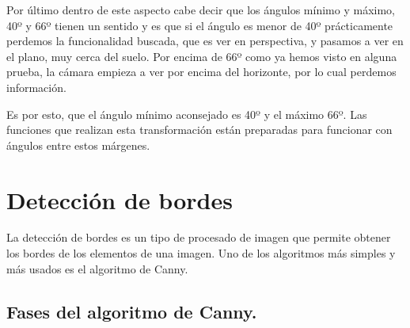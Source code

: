 Por último dentro de este aspecto cabe decir que los ángulos mínimo y máximo, 40º y 66º tienen un sentido y es que si el ángulo es menor de 40º prácticamente perdemos la funcionalidad buscada, que es ver en perspectiva, y pasamos a ver en el plano, muy cerca del suelo. Por encima de 66º como ya hemos visto en alguna prueba, la cámara empieza a ver por encima del horizonte, por lo cual perdemos información.

Es por esto, que el ángulo mínimo aconsejado es 40º y el máximo 66º. Las funciones que realizan esta transformación están preparadas para funcionar con ángulos entre estos márgenes.


\section{Detección de bordes}
La detección de bordes es un tipo de procesado de imagen que permite obtener los bordes de los elementos de una imagen. Uno de los algoritmos más simples y más usados es el algoritmo de Canny\cite{canny_edge}. 

\subsection{Fases del algoritmo de Canny.}

